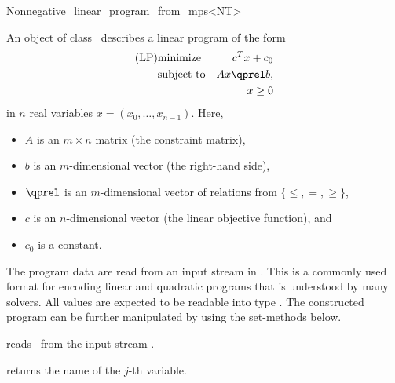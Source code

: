 \begin{ccRefClass}{Nonnegative_linear_program_from_mps<NT>}


\ccDefinition
An object of class \ccRefName\ describes a linear program of the form
\begin{eqnarray*}
\mbox{(LP)}& \mbox{minimize} & c^{T}x+c_0 \\
&\mbox{subject to}   & Ax\qprel b, \\
&                    & x \geq 0
\end{eqnarray*}
in $n$ real variables $x=(x_0,\ldots,x_{n-1})$.
Here, 
\begin{itemize}
\item $A$ is an $m\times n$ matrix (the constraint matrix), 
\item $b$ is an $m$-dimensional vector (the right-hand side),
\item $\qprel$ is an $m$-dimensional vector of relations 
from $\{\leq, =, \geq\}$, 
\item $c$ is an $n$-dimensional vector (the linear objective
  function), and 
\item $c_0$ is a constant.
\end{itemize}

The program data are read from an input stream in . This is
a commonly used format for encoding linear and quadratic programs that
is understood by many solvers. All values are expected to be readable
into type . The constructed program can be further manipulated 
by using the set-methods below.

\ccIsModel
{}

\ccTypes
{}

\ccCreation
\ccIndexClassCreation
{}

{reads \ccVar\ from the input stream .}

\ccOperations


{returns the name of the $j$-th variable.}



\end{ccRefClass}
